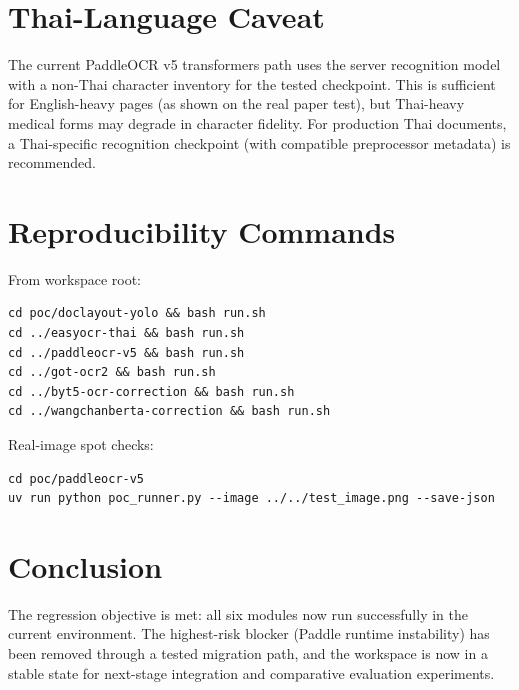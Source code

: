 \documentclass[11pt,a4paper]{article}
\begin{document}
\section{Thai-Language Caveat}
The current PaddleOCR v5 transformers path uses the server recognition model with a non-Thai character inventory for the tested checkpoint. This is sufficient for English-heavy pages (as shown on the real paper test), but Thai-heavy medical forms may degrade in character fidelity. For production Thai documents, a Thai-specific recognition checkpoint (with compatible preprocessor metadata) is recommended.

\section{Reproducibility Commands}
From workspace root:
\begin{verbatim}
cd poc/doclayout-yolo && bash run.sh
cd ../easyocr-thai && bash run.sh
cd ../paddleocr-v5 && bash run.sh
cd ../got-ocr2 && bash run.sh
cd ../byt5-ocr-correction && bash run.sh
cd ../wangchanberta-correction && bash run.sh
\end{verbatim}

Real-image spot checks:
\begin{verbatim}
cd poc/paddleocr-v5
uv run python poc_runner.py --image ../../test_image.png --save-json
\end{verbatim}

\section{Conclusion}
The regression objective is met: all six modules now run successfully in the current environment. The highest-risk blocker (Paddle runtime instability) has been removed through a tested migration path, and the workspace is now in a stable state for next-stage integration and comparative evaluation experiments.
\end{document}

